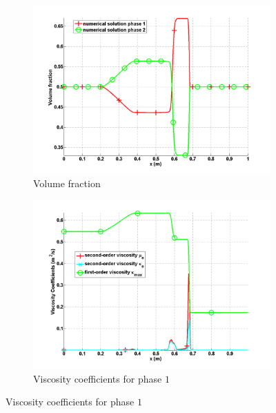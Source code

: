 \documentclass{anstrans}
\begin{document}
\begin{figure}[H]
        \begin{subfigure}[b]{0.495\textwidth}
                \centering
                \includegraphics[width=\textwidth]{plots/relaxation_two_phases_volume_fraction.png}
                \caption{Volume fraction}
                \label{fig:volume_fraction}
        \end{subfigure}
        
        \begin{subfigure}[b]{0.495\textwidth}
                \centering
                \includegraphics[width=\textwidth]{plots/relaxation_two_phases_liquid_viscosity_kappa_mu.png}
                \caption{Viscosity coefficients for phase $1$}
                \label{fig:viscosity_coeff_liq}
        \end{subfigure}        
				

\end{figure}
\end{document}
